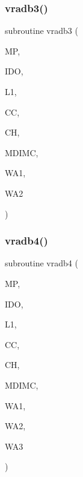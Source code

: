 \mbox{\label{sfft_8f_a369ffff45441a6f6cee162a47056786f}} 
\subsubsection{\texorpdfstring{vradb3()}{vradb3()}}
{\footnotesize\ttfamily subroutine vradb3 (\begin{DoxyParamCaption}\item[{}]{MP,  }\item[{}]{I\+DO,  }\item[{}]{L1,  }\item[{dimension(mdimc,ido,3,l1)}]{CC,  }\item[{dimension(mdimc,ido,l1,3)}]{CH,  }\item[{}]{M\+D\+I\+MC,  }\item[{dimension(ido)}]{W\+A1,  }\item[{dimension(ido)}]{W\+A2 }\end{DoxyParamCaption})}

\mbox{\label{sfft_8f_a19331a52326efa3912dfc83154027fdb}} 
\subsubsection{\texorpdfstring{vradb4()}{vradb4()}}
{\footnotesize\ttfamily subroutine vradb4 (\begin{DoxyParamCaption}\item[{}]{MP,  }\item[{}]{I\+DO,  }\item[{}]{L1,  }\item[{dimension(mdimc,ido,4,l1)}]{CC,  }\item[{dimension(mdimc,ido,l1,4)}]{CH,  }\item[{}]{M\+D\+I\+MC,  }\item[{dimension(ido)}]{W\+A1,  }\item[{dimension(ido)}]{W\+A2,  }\item[{dimension(ido)}]{W\+A3 }\end{DoxyParamCaption})}

\mbox{\label{sfft_8f_a28be0d946044b62f3b112bc9189d39c4}} 
